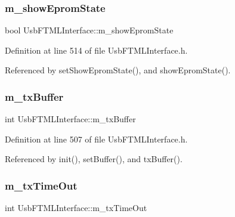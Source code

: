 \subsubsection{\texorpdfstring{m\+\_\+show\+Eprom\+State}{m\_showEpromState}}
{\footnotesize\ttfamily bool Usb\+F\+T\+M\+L\+Interface\+::m\+\_\+show\+Eprom\+State\hspace{0.3cm}{\ttfamily [private]}}



Definition at line 514 of file Usb\+F\+T\+M\+L\+Interface.\+h.



Referenced by set\+Show\+Eprom\+State(), and show\+Eprom\+State().

\mbox{\label{classUsbFTMLInterface_a4057fb62dc732ffe98df5c46231d7a23}} 
\subsubsection{\texorpdfstring{m\+\_\+tx\+Buffer}{m\_txBuffer}}
{\footnotesize\ttfamily int Usb\+F\+T\+M\+L\+Interface\+::m\+\_\+tx\+Buffer\hspace{0.3cm}{\ttfamily [private]}}



Definition at line 507 of file Usb\+F\+T\+M\+L\+Interface.\+h.



Referenced by init(), set\+Buffer(), and tx\+Buffer().

\mbox{\label{classUsbFTMLInterface_a48cd0df4e1d8fd53d96b208b5b9c7061}} 
\subsubsection{\texorpdfstring{m\+\_\+tx\+Time\+Out}{m\_txTimeOut}}
{\footnotesize\ttfamily int Usb\+F\+T\+M\+L\+Interface\+::m\+\_\+tx\+Time\+Out\hspace{0.3cm}{\ttfamily [private]}}



